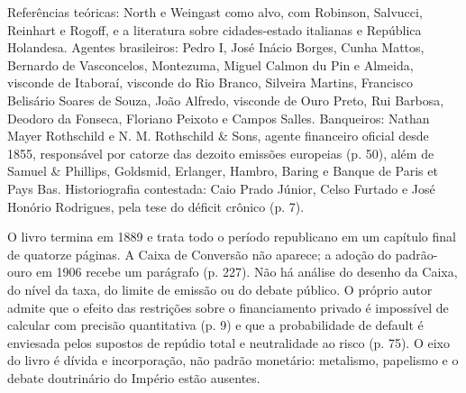 Referências teóricas: North e Weingast como alvo, com Robinson, Salvucci, Reinhart e Rogoff, e a literatura sobre cidades-estado italianas e República Holandesa. Agentes brasileiros: Pedro I, José Inácio Borges, Cunha Mattos, Bernardo de Vasconcelos, Montezuma, Miguel Calmon du Pin e Almeida, visconde de Itaboraí, visconde do Rio Branco, Silveira Martins, Francisco Belisário Soares de Souza, João Alfredo, visconde de Ouro Preto, Rui Barbosa, Deodoro da Fonseca, Floriano Peixoto e Campos Salles. Banqueiros: Nathan Mayer Rothschild e N. M. Rothschild \& Sons, agente financeiro oficial desde 1855, responsável por catorze das dezoito emissões europeias (p. 50), além de Samuel \& Phillips, Goldsmid, Erlanger, Hambro, Baring e Banque de Paris et Pays Bas. Historiografia contestada: Caio Prado Júnior, Celso Furtado e José Honório Rodrigues, pela tese do déficit crônico (p. 7).

O livro termina em 1889 e trata todo o período republicano em um capítulo final de quatorze páginas. A Caixa de Conversão não aparece; a adoção do padrão-ouro em 1906 recebe um parágrafo (p. 227). Não há análise do desenho da Caixa, do nível da taxa, do limite de emissão ou do debate público. O próprio autor admite que o efeito das restrições sobre o financiamento privado é impossível de calcular com precisão quantitativa (p. 9) e que a probabilidade de default é enviesada pelos supostos de repúdio total e neutralidade ao risco (p. 75). O eixo do livro é dívida e incorporação, não padrão monetário: metalismo, papelismo e o debate doutrinário do Império estão ausentes.

